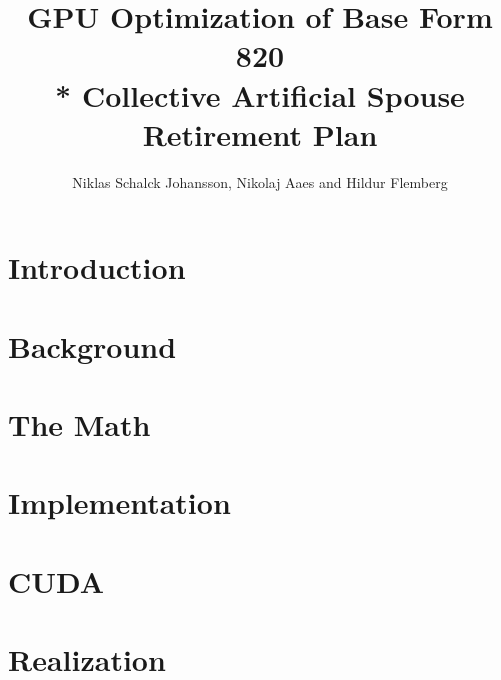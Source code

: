 \documentclass[oribibl]{llncs}
\title{GPU Optimization of Base Form 820 \\* Collective Artificial Spouse Retirement Plan}
\author{Niklas Schalck Johansson, Nikolaj Aaes and Hildur Flemberg\\
\email{\{nsjo, niaa, hufl\}@itu.dk}}
\institute{IT University of Copenhagen}
\begin{document}
	\maketitle
	\tableofcontents
	\pagebreak
	
	
	\begin{abstract}
		
		\label{abstract}
	\end{abstract}
	
	\section{Introduction}
	
	
	\label{introduction}
		
	\section{Background}
		
	
	\label{background}
		
	\section{The Math}
		
	
	\label{themath}
		
	\section{Implementation}

	
	\label{implementation}
		
	\section{CUDA}

	
	\label{cuda}
	
	\section{Realization}
	
	
	\label{realization}
		
\end{document}
